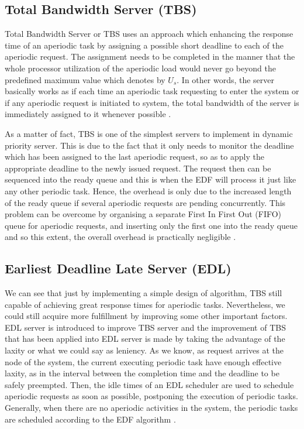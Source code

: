 \subsection{Total Bandwidth Server (TBS)}

Total Bandwidth Server or TBS uses an approach which enhancing the response time of an aperiodic task by assigning a possible short deadline to each of the aperiodic request. The assignment needs to be completed in the manner that the whole processor utilization of the aperiodic load would never go beyond the predefined maximum value which denotes by $U_{s}$. In other words, the server basically works as if each time an aperiodic task requesting to enter the system or if any aperiodic request is initiated to system, the total bandwidth of the server is immediately assigned to it whenever possible \cite{b6}.

As a matter of fact, TBS is one of the simplest servers to implement in dynamic priority server. This is due to the fact that it only needs to monitor the deadline which has been assigned to the last aperiodic request, so as to apply the appropriate deadline to the newly issued request. The request then can be sequenced into the ready queue and this is when the EDF will process it just like any other periodic task. Hence, the overhead is only due to the increased length of the ready queue if several aperiodic requests are pending concurrently. This problem can be overcome by organising a separate First In First Out (FIFO) queue for aperiodic requests, and inserting only the first one into the ready queue and so this extent, the overall overhead is practically negligible \cite{b2}.

\subsection{Earliest Deadline Late Server (EDL)}

We can see that just by implementing a simple design of algorithm, TBS still capable of achieving great response times for aperiodic tasks. Nevertheless, we could still acquire more fulfillment by improving some other important factors. EDL server is introduced to improve TBS server and the improvement of TBS that has been applied into EDL server is made by taking the advantage of the laxity or what we could say as leniency. As we know, as request arrives at the node of the system, the current executing periodic task have enough effective laxity, as in the interval between the completion time and the deadline to be safely preempted. Then, the idle times of an EDL scheduler are used to schedule aperiodic requests as soon as possible, postponing the execution of periodic tasks. Generally, when there are no aperiodic activities in the system, the periodic tasks are scheduled according to the EDF algorithm \cite{b8}.

